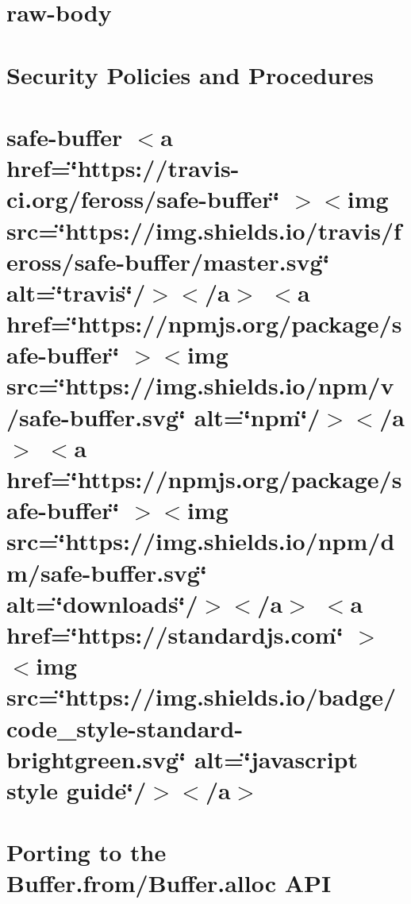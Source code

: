 \documentclass[twoside]{book}
\newcommand{\+}{\discretionary{\mbox{\scriptsize$\hookleftarrow$}}{}{}}
\begin{document}
\chapter{raw-\/body}
\label{md_Backend_nodejs_node_modules_raw_body_README}

\chapter{Security Policies and Procedures}
\label{md_Backend_nodejs_node_modules_raw_body_SECURITY}

\chapter{safe-\/buffer \texorpdfstring{$<$}{<}a href=\char`\"{}https\+://travis-\/ci.\+org/feross/safe-\/buffer\char`\"{} \texorpdfstring{$>$}{>}\texorpdfstring{$<$}{<}img src=\char`\"{}https\+://img.\+shields.\+io/travis/feross/safe-\/buffer/master.\+svg\char`\"{} alt=\char`\"{}travis\char`\"{}/\texorpdfstring{$>$}{>}\texorpdfstring{$<$}{<}/a\texorpdfstring{$>$}{>} \texorpdfstring{$<$}{<}a href=\char`\"{}https\+://npmjs.\+org/package/safe-\/buffer\char`\"{} \texorpdfstring{$>$}{>}\texorpdfstring{$<$}{<}img src=\char`\"{}https\+://img.\+shields.\+io/npm/v/safe-\/buffer.\+svg\char`\"{} alt=\char`\"{}npm\char`\"{}/\texorpdfstring{$>$}{>}\texorpdfstring{$<$}{<}/a\texorpdfstring{$>$}{>} \texorpdfstring{$<$}{<}a href=\char`\"{}https\+://npmjs.\+org/package/safe-\/buffer\char`\"{} \texorpdfstring{$>$}{>}\texorpdfstring{$<$}{<}img src=\char`\"{}https\+://img.\+shields.\+io/npm/dm/safe-\/buffer.\+svg\char`\"{} alt=\char`\"{}downloads\char`\"{}/\texorpdfstring{$>$}{>}\texorpdfstring{$<$}{<}/a\texorpdfstring{$>$}{>} \texorpdfstring{$<$}{<}a href=\char`\"{}https\+://standardjs.\+com\char`\"{} \texorpdfstring{$>$}{>}\texorpdfstring{$<$}{<}img src=\char`\"{}https\+://img.\+shields.\+io/badge/code\+\_\+style-\/standard-\/brightgreen.\+svg\char`\"{} alt=\char`\"{}javascript style guide\char`\"{}/\texorpdfstring{$>$}{>}\texorpdfstring{$<$}{<}/a\texorpdfstring{$>$}{>}}
\label{md_Backend_nodejs_node_modules_safe_buffer_README}

\chapter{Porting to the Buffer.\+from/\+Buffer.alloc API}
\label{md_Backend_nodejs_node_modules_safer_buffer_Porting_Buffer}

\end{document}
